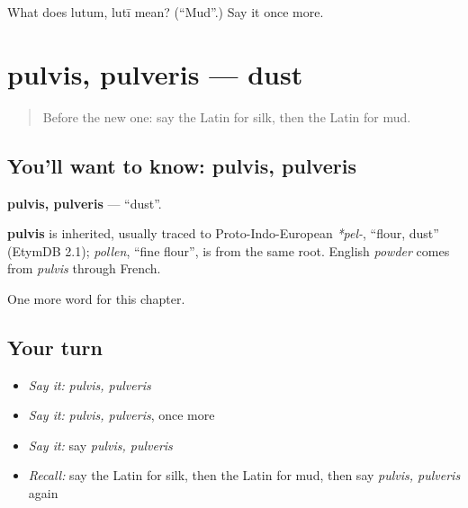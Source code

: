 \begin{tcolorbox}[breakable,colback=teal!4,colframe=teal!35!black,title={Before you move on}]
What does lutum, lutī mean? (\textquotedblleft{}Mud\textquotedblright{}.) Say it once more.
\end{tcolorbox}
\section[pulvis, pulveris]{pulvis, pulveris — dust}

\label{lesson:LA-C275-pulvis}



\begin{quote}
Before the new one: say the Latin for silk, then the Latin for mud.
\end{quote}

\subsection*{You'll want to know: pulvis, pulveris}
\textbf{pulvis, pulveris} — \textquotedblleft{}dust\textquotedblright{}.

\begin{cousinweb}
\textbf{pulvis} is inherited, usually traced to Proto-Indo-European \emph{*pel-}, \textquotedblleft{}flour, dust\textquotedblright{} (EtymDB 2.1); \emph{pollen}, \textquotedblleft{}fine flour\textquotedblright{}, is from the same root. English \emph{powder} comes from \emph{pulvis} through French.
\end{cousinweb}

\begin{grammarlens}[title={What you've built}]
One more word for this chapter.
\end{grammarlens}

\subsection*{Your turn}
\begin{itemize}
\raggedright
  \item \emph{Say it:} \emph{pulvis, pulveris}
  \item \emph{Say it:} \emph{pulvis, pulveris}, once more
  \item \emph{Say it:} say \emph{pulvis, pulveris}
  \item \emph{Recall:} say the Latin for silk, then the Latin for mud, then say \emph{pulvis, pulveris} again
\end{itemize}

